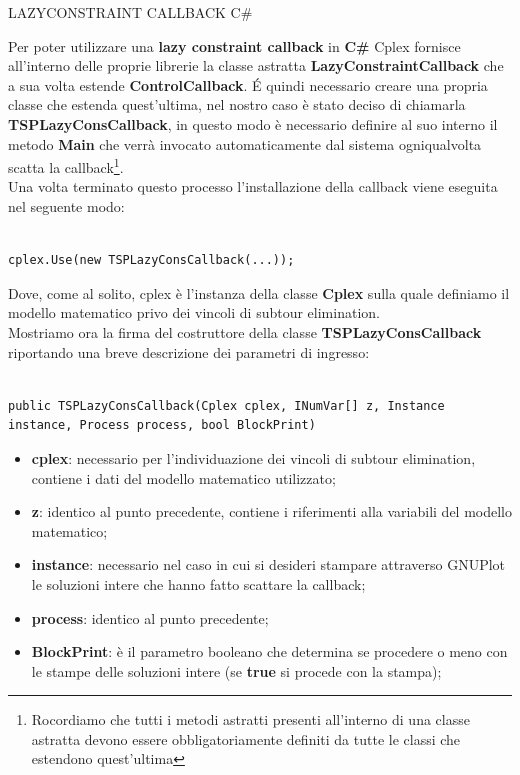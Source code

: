 \documentclass[11pt]{article}
\begin{document}
\vspace{2\baselineskip}
LAZYCONSTRAINT CALLBACK C\#
\vspace{2\baselineskip}


Per poter utilizzare una \textbf{lazy constraint callback} in \textbf{C\#} Cplex fornisce all'interno delle proprie librerie la classe astratta \textbf{LazyConstraintCallback} che a sua volta estende \textbf{ControlCallback}. \'E quindi necessario creare una propria classe che estenda quest'ultima, nel nostro caso è stato deciso di chiamarla \textbf{TSPLazyConsCallback}, in questo modo è necessario definire al suo interno il metodo \textbf{Main} che verrà invocato automaticamente dal sistema ogniqualvolta scatta la callback\footnote{Rocordiamo che tutti i metodi astratti presenti all'interno di una classe astratta devono essere obbligatoriamente definiti da tutte le classi che estendono quest'ultima}.\\
Una volta terminato questo processo l'installazione della callback viene eseguita nel seguente modo:

\begin{lstlisting}

cplex.Use(new TSPLazyConsCallback(...));

\end{lstlisting}

Dove, come al solito, cplex è l'instanza della classe \textbf{Cplex} sulla quale definiamo il modello matematico privo dei vincoli di subtour elimination.\\
Mostriamo ora la firma del costruttore della classe \textbf{TSPLazyConsCallback} riportando una breve descrizione dei parametri di ingresso:

\begin{lstlisting}

public TSPLazyConsCallback(Cplex cplex, INumVar[] z, Instance instance, Process process, bool BlockPrint)

\end{lstlisting}

\begin{itemize}
    \item \textbf{cplex}: necessario per l'individuazione dei vincoli di subtour elimination, contiene i dati del modello matematico utilizzato;
    \item \textbf{z}: identico al punto precedente, contiene i riferimenti alla variabili del modello matematico;
    \item \textbf{instance}: necessario nel caso in cui si desideri stampare attraverso GNUPlot le soluzioni intere che hanno fatto scattare la callback;
    \item \textbf{process}: identico al punto precedente;
    \item \textbf{BlockPrint}: è il parametro booleano che determina se procedere o meno con le stampe delle soluzioni intere (se \textbf{true} si procede con la stampa);
\end{itemize}
\end{document}
